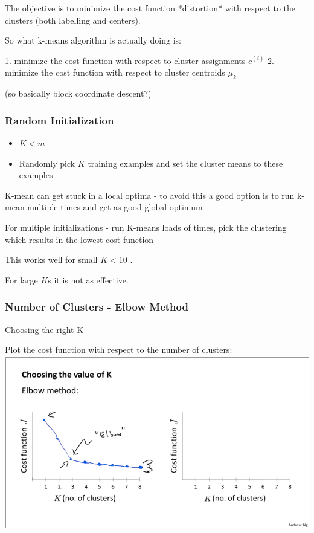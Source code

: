 The objective is to minimize the cost function *distortion* with respect to the clusters (both labelling and centers).

So what k-means algorithm is actually doing is:

1. minimize the cost function with respect to cluster assignments $c^{(i)}$
2. minimize the cost function with respect to cluster centroids $\mu_k$ 

(so basically block coordinate descent?)

\subsubsection{Random Initialization}

\begin{itemize}
\item $K < m$
\item Randomly pick $K$ training examples and set the cluster means to these examples
\end{itemize}

K-mean can get stuck in a local optima - to avoid this a good option is to run k-mean multiple times and get as good global optimum

For multiple initializations - run K-means loads of times, pick the clustering which results in the lowest cost function

This works well for small $K < 10$ .

For large $K$s it is not as effective.

\subsubsection{Number of Clusters - Elbow Method}

Choosing the right K 

Plot the cost function with respect to the number of clusters:
\includegraphics[width=0.9\columnwidth]{ml_figures/elbow.png}

